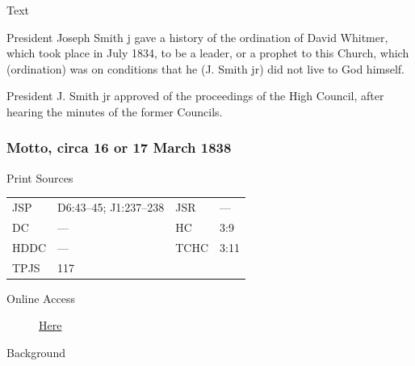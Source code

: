 				\begin{description}
					\item[Text]
				\end{description}
				
					President Joseph Smith j gave a history of the ordination of David Whitmer, which took place in July 1834, to be a leader, or a prophet to this Church, which (ordination) was on conditions that he (J. Smith jr) did not live to God himself.
					
					President J. Smith jr approved of the proceedings of the High Council, after hearing the minutes of the former Councils.
					
		\subsubsection{Motto, circa 16 or 17 March 1838}
			\label{EMS-1838-JS-CIR-16-17-MAR-1838}
			
			\begin{description}
					\item[Print Sources]
				\end{description}

					\begin{tabular}{p{0.5in}p{1in}p{0.5in}p{1in}}
					JSP	 	& D6:43--45; J1:237--238		& JSR 		& --- \\
					DC	 	& ---		& HC 		& 3:9 \\
					HDDC 	& ---		& TCHC 		& 3:11 \\
					TPJS 	& 117			& 	 		&  \\
					\end{tabular}
				
				\begin{description}
					\item[Online Access] \href{https://www.josephsmithpapers.org/paper-summary/motto-circa-16-or-17-march-1838/1}{Here}
				\end{description}
				
				\begin{description}
					\item[Background]
				\end{description}
				
				
